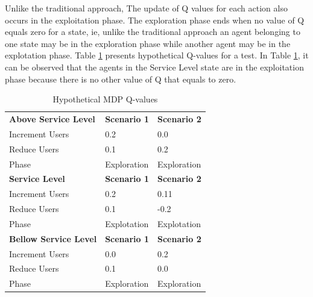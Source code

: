 \documentclass{report}
\begin{document}
 

Unlike the traditional approach, The update of Q values for each action also occurs in the exploitation phase. The exploration phase ends when no value of Q equals zero for a state, ie, unlike the traditional approach an agent belonging to one state may be in the exploration phase while another agent may be in the explotation phase. Table \ref{pab:mdp} presents hypothetical Q-values for a test. In Table \ref{pab:mdp}, it can be observed that the agents in the Service Level state are in the exploitation phase because there is no other value of Q that equals to zero.


\begin{table}[h]
\centering
\caption{Hypothetical MDP Q-values }
\label{pab:mdp}
\begin{tabular}{lll}
\rowcolor[HTML]{C0C0C0} 
\textbf{Above Service Level}  & \textbf{Scenario 1} & \textbf{Scenario 2} \\
Increment Users               & 0.2                 & 0.0                 \\
Reduce Users                  & 0.1                 & 0.2                 \\
Phase                         & Exploration         & Exploration         \\
\rowcolor[HTML]{C0C0C0} 
\textbf{Service Level}        & \textbf{Scenario 1} & \textbf{Scenario 2} \\
Increment Users               & 0.2                 & 0.11                \\
Reduce Users                  & 0.1                 & -0.2                \\
\rowcolor[HTML]{F8FF00} 
Phase                         & Explotation         & Explotation         \\
\rowcolor[HTML]{C0C0C0} 
\textbf{Bellow Service Level} & \textbf{Scenario 1} & \textbf{Scenario 2} \\
Increment Users               & 0.0                 & 0.2                 \\
Reduce Users                  & 0.1                 & 0.0                 \\
Phase                         & Exploration         & Exploration        
\end{tabular}
\end{table}
\end{document}
